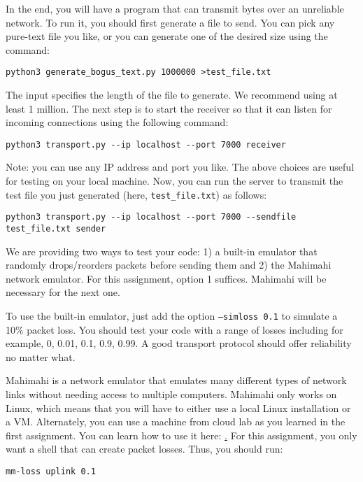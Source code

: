 \documentclass{article}
\begin{document}
In the end, you will have a program that can transmit bytes over an unreliable network. To run it, you should first generate a file to send. You can pick any pure-text file you like, or you can generate one of the desired size using the command:

\begin{verbatim}
python3 generate_bogus_text.py 1000000 >test_file.txt
\end{verbatim}

The input specifies the length of the file to generate. We recommend using at least 1 million. The next step is to start the receiver so that it can listen for incoming connections using the following command:

\begin{verbatim}
python3 transport.py --ip localhost --port 7000 receiver
\end{verbatim}

Note: you can use any IP address and port you like. The above choices are useful for testing on your local machine. Now, you can run the server to transmit the test file you just generated (here, {\tt test_file.txt}) as follows:

\begin{verbatim}
python3 transport.py --ip localhost --port 7000 --sendfile test_file.txt sender
\end{verbatim}

We are providing two ways to test your code: 1) a built-in emulator that randomly drops/reorders packets before sending them and 2) the Mahimahi network emulator. For this assignment, option 1 suffices. Mahimahi will be necessary for the next one.

To use the built-in emulator, just add the option {\tt --simloss 0.1} to simulate a 10\% packet loss. You should test your code with a range of losses including for example, 0, 0.01, 0.1, 0.9, 0.99. A good transport protocol should offer reliability no matter what.

Mahimahi is a network emulator that emulates many different types of network links without needing access to multiple computers. Mahimahi only works on Linux, which means that you will have to either use a local Linux installation or a VM. Alternately, you can use a machine from cloud lab as you learned in the first assignment. You can learn how to use it here: \href{http://mahimahi.mit.edu}. For this assignment, you only want a shell that can create packet losses. Thus, you should run:

\begin{verbatim}
mm-loss uplink 0.1
\end{verbatim}
\end{document}
